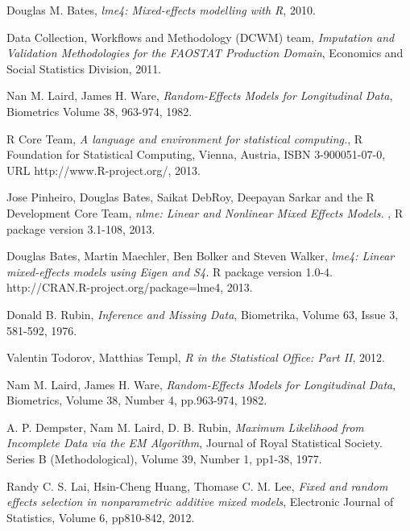 \documentclass[nojss]{jss}\usepackage[]{graphicx}\usepackage[]{color}
\begin{document}
  
  
\begin{thebibliography}{11}
  Douglas M. Bates,
  \emph{lme4: Mixed-effects modelling with R},
  2010.
  
  Data Collection, Workflows and Methodology (DCWM) team,
  \emph{Imputation and Validation Methodologies for the FAOSTAT Production Domain},
  Economics and Social Statistics Division,
  2011.
  
  Nan M. Laird, James H. Ware,
  \emph{Random-Effects Models for Longitudinal Data},
  Biometrics Volume 38, 963-974,
  1982.
  
  R Core Team,
  \emph{A language and environment for statistical computing.},
  R Foundation for Statistical Computing, Vienna, Austria,
  ISBN 3-900051-07-0, URL http://www.R-project.org/,
  2013.
  
  Jose Pinheiro, Douglas Bates, Saikat DebRoy, Deepayan Sarkar and the
  R Development Core Team,
  \emph{nlme: Linear and Nonlinear Mixed Effects Models.} ,
  R package version 3.1-108,
  2013.

  Douglas Bates, Martin Maechler, Ben Bolker and Steven Walker,
  \emph{lme4: Linear mixed-effects models using Eigen and S4.} 
  R package version 1.0-4. http://CRAN.R-project.org/package=lme4,
  2013.
 
  Donald B. Rubin,
  \emph{Inference and Missing Data},
  Biometrika, Volume 63, Issue 3, 581-592,
  1976.
  
  Valentin Todorov, Matthias Templ,
  \emph{R in the Statistical Office: Part II},
  2012.
  
  Nam M. Laird, James H. Ware,
  \emph{Random-Effects Models for Longitudinal Data},
  Biometrics, Volume 38, Number 4, pp.963-974,
  1982.

  A. P. Dempster, Nam M. Laird, D. B. Rubin,
  \emph{Maximum Likelihood from Incomplete Data via the EM Algorithm},
  Journal of Royal Statistical Society. Series B (Methodological), Volume 39, Number 1, pp1-38,
  1977.
  
  Randy C. S. Lai, Hsin-Cheng Huang, Thomase C. M. Lee,
  \emph{Fixed and random effects selection in nonparametric additive mixed models},
  Electronic Journal of Statistics, Volume 6, pp810-842,
  2012.
\end{thebibliography}
  
\end{document}
